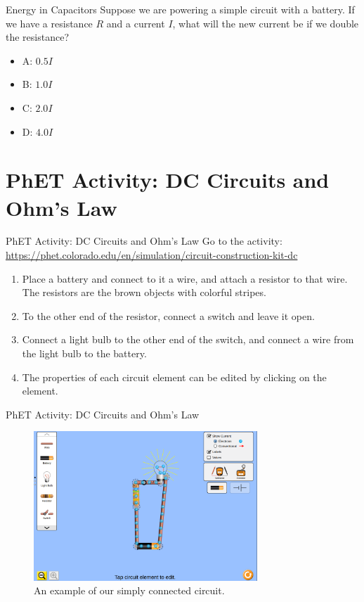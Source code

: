 \documentclass{beamer}
\begin{document}
\begin{frame}{Energy in Capacitors}
Suppose we are powering a simple circuit with a battery.  If we have a resistance $R$ and a current $I$, what will the new current be if we double the resistance?
\begin{itemize}
\item A: $0.5 I$
\item B: $1.0 I$
\item C: $2.0 I$
\item D: $4.0 I$
\end{itemize}
\end{frame}

\section{PhET Activity: DC Circuits and Ohm's Law}

\begin{frame}{PhET Activity: DC Circuits and Ohm's Law}
Go to the activity: \url{https://phet.colorado.edu/en/simulation/circuit-construction-kit-dc} \\
\begin{enumerate}
\item Place a battery and connect to it a wire, and attach a resistor to that wire.  The resistors are the brown objects with colorful stripes.
\item To the other end of the resistor, connect a switch and leave it open.
\item Connect a light bulb to the other end of the switch, and connect a wire from the light bulb to the battery.
\item The properties of each circuit element can be edited by clicking on the element.
\end{enumerate}
\end{frame}

\begin{frame}{PhET Activity: DC Circuits and Ohm's Law}
\begin{figure}
\centering
\includegraphics[width=0.75\textwidth]{figures/PhETBulb.png}
\caption{\label{fig:phetb} An example of our simply connected circuit.}
\end{figure}
\end{frame}
\end{document}
